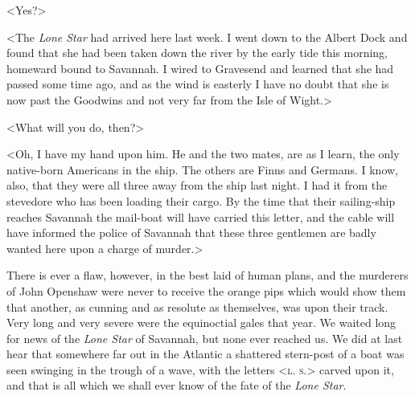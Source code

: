<Yes?>

<The \textit{Lone Star} had arrived here last week. I went down to the Albert Dock and found that she had been taken down the river by the early tide this morning, homeward bound to Savannah. I wired to Gravesend and learned that she had passed some time ago, and as the wind is easterly I have no doubt that she is now past the Goodwins and not very far from the Isle of Wight.>

<What will you do, then?>

<Oh, I have my hand upon him. He and the two mates, are as I learn, the only native-born Americans in the ship. The others are Finns and Germans. I know, also, that they were all three away from the ship last night. I had it from the stevedore who has been loading their cargo. By the time that their sailing-ship reaches Savannah the mail-boat will have carried this letter, and the cable will have informed the police of Savannah that these three gentlemen are badly wanted here upon a charge of murder.>

There is ever a flaw, however, in the best laid of human plans, and the murderers of John Openshaw were never to receive the orange pips which would show them that another, as cunning and as resolute as themselves, was upon their track. Very long and very severe were the equinoctial gales that year. We waited long for news of the \textit{Lone Star} of Savannah, but none ever reached us. We did at last hear that somewhere far out in the Atlantic a shattered stern-post of a boat was seen swinging in the trough of a wave, with the letters <\textsc{l. s.}> carved upon it, and that is all which we shall ever know of the fate of the \textit{Lone Star}.